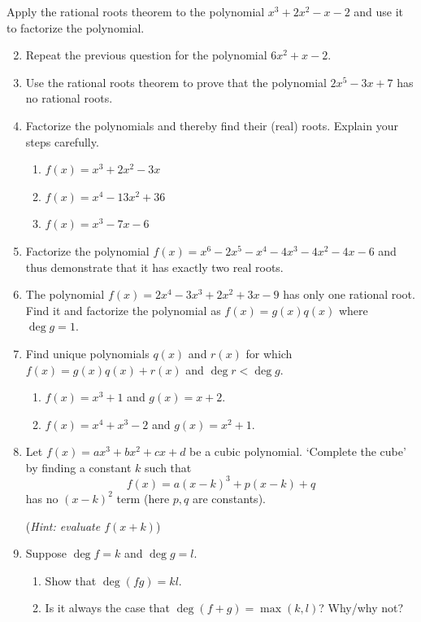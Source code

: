 \begin{exercises}{}{}
	\exstart Apply the rational roots theorem to the polynomial $x^3+2x^2-x-2$ and use it to factorize the polynomial.
	\begin{enumerate}\setcounter{enumi}{1}
	  \item Repeat the previous question for the polynomial $6x^2+x-2$.
	
		\item Use the rational roots theorem to prove that the polynomial $2x^5-3x+7$ has no rational roots.
	  
	  \item Factorize the polynomials and thereby find their (real) roots. Explain your steps carefully.
	  \begin{enumerate}
	    \item $f(x)=x^3+2x^2-3x$ %
	    \item $f(x)=x^4-13x^2+36$ %
	    \item $f(x)=x^3-7x-6$ %
	  \end{enumerate}
	  
	  
	  \item Factorize the polynomial $f(x)=x^6-2x^5-x^4-4x^3-4x^2-4x-6$ %
	  and thus demonstrate that it has exactly two real roots.
	  
		
		\item The polynomial $f(x)=2x^4-3x^3+2x^2+3x-9$ has only one rational root. Find it and factorize the polynomial as $f(x)=g(x)q(x)$ where $\deg g=1$.
		
		
		\item Find unique polynomials $q(x)$ and $r(x)$ for which $f(x)=g(x)q(x)+r(x)$ and $\deg r<\deg g$.
		\begin{enumerate}
		  \item $f(x)=x^3+1$ and $g(x)=x+2$.
		  \item	$f(x)=x^4+x^3-2$ and $g(x)=x^2+1$.
		\end{enumerate}  
	
	
	  \item Let $f(x)=ax^3+bx^2+cx+d$ be a cubic polynomial. `Complete the cube' by finding a constant $k$ such that
	  \[
	  	f(x)=a(x-k)^3+p(x-k)+q
	  \]
	  has no $(x-k)^2$ term (here $p,q$ are constants).\par
	  (\emph{Hint: evaluate $f(x+k)$})
	  
	  
	  \item Suppose $\deg f=k$ and $\deg g=l$.
	  \begin{enumerate}
	    \item Show that $\deg(fg)=kl$.
	    \item Is it always the case that $\deg(f+g)=\max(k,l)$? Why/why not?
	  \end{enumerate}
	\end{enumerate}
\end{exercises}


